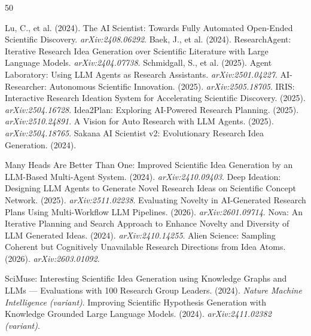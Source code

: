\documentclass[10pt,a4paper]{article}
\begin{document}

\begin{thebibliography}{50}

 Lu, C., et al. (2024). The AI Scientist: Towards Fully Automated Open-Ended Scientific Discovery. \textit{arXiv:2408.06292}.
 Baek, J., et al. (2024). ResearchAgent: Iterative Research Idea Generation over Scientific Literature with Large Language Models. \textit{arXiv:2404.07738}.
 Schmidgall, S., et al. (2025). Agent Laboratory: Using LLM Agents as Research Assistants. \textit{arXiv:2501.04227}.
 AI-Researcher: Autonomous Scientific Innovation. (2025). \textit{arXiv:2505.18705}.
 IRIS: Interactive Research Ideation System for Accelerating Scientific Discovery. (2025). \textit{arXiv:2504.16728}.
 Idea2Plan: Exploring AI-Powered Research Planning. (2025). \textit{arXiv:2510.24891}.
 A Vision for Auto Research with LLM Agents. (2025). \textit{arXiv:2504.18765}.
 Sakana AI Scientist v2: Evolutionary Research Idea Generation. (2024).

 Many Heads Are Better Than One: Improved Scientific Idea Generation by an LLM-Based Multi-Agent System. (2024). \textit{arXiv:2410.09403}.
 Deep Ideation: Designing LLM Agents to Generate Novel Research Ideas on Scientific Concept Network. (2025). \textit{arXiv:2511.02238}.
 Evaluating Novelty in AI-Generated Research Plans Using Multi-Workflow LLM Pipelines. (2026). \textit{arXiv:2601.09714}.
 Nova: An Iterative Planning and Search Approach to Enhance Novelty and Diversity of LLM Generated Ideas. (2024). \textit{arXiv:2410.14255}.
 Alien Science: Sampling Coherent but Cognitively Unavailable Research Directions from Idea Atoms. (2026). \textit{arXiv:2603.01092}.

 SciMuse: Interesting Scientific Idea Generation using Knowledge Graphs and LLMs --- Evaluations with 100 Research Group Leaders. (2024). \textit{Nature Machine Intelligence (variant)}.
 Improving Scientific Hypothesis Generation with Knowledge Grounded Large Language Models. (2024). \textit{arXiv:2411.02382 (variant)}.


\end{thebibliography}
\end{document}
